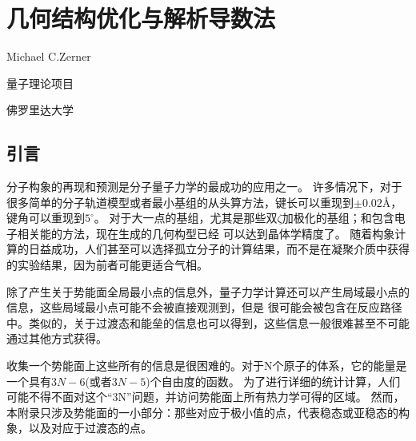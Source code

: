 \chapter{几何结构优化与解析导数法}
\label{appendix:c}

Michael C.Zerner

量子理论项目

佛罗里达大学

\section{引言}

分子构象的再现和预测是分子量子力学的最成功的应用之一。
许多情况下，对于很多简单的分子轨道模型或者最小基组的从头算方法，键长可以重现到$\pm 0.02$\r A，
键角可以重现到$5^{\circ}$。
对于大一点的基组，尤其是那些双$\zeta$加极化的基组；和包含电子相关能的方法，现在生成的几何构型已经
可以达到晶体学精度了。
随着构象计算的日益成功，人们甚至可以选择孤立分子的计算结果，而不是在凝聚介质中获得的实验结果，因为前者可能更适合气相。

除了产生关于势能面全局最小点的信息外，量子力学计算还可以产生局域最小点的信息，这些局域最小点可能不会被直接观测到，但是
很可能会被包含在反应路径中。类似的，关于过渡态和能垒的信息也可以得到，这些信息一般很难甚至不可能通过其他方式获得。

收集一个势能面上这些所有的信息是很困难的。对于N个原子的体系，它的能量是一个具有$3N-6$(或者$3N-5$)个自由度的函数。
为了进行详细的统计计算，人们可能不得不面对这个“3N”问题，并访问势能面上所有热力学可得的区域。
然而，本附录只涉及势能面的一小部分：那些对应于极小值的点，代表稳态或亚稳态的构象，以及对应于过渡态的点。

